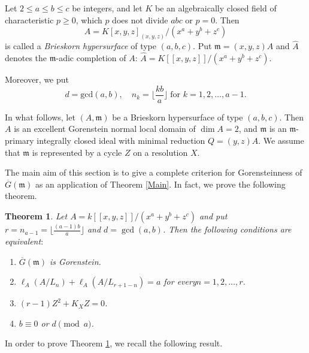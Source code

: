 \documentclass[12pt]{amsart}
\newtheorem{thm}{Theorem}[section]
\theoremstyle{definition}
\theoremstyle{remark}
\numberwithin{equation}{section}
\newcommand{\m}{\mathfrak m}
\renewcommand{\:}{\colon}
\begin{document}
\par \vspace{2mm}
Let  $2 \le a \le b \le c$ be integers, and let $K$ be an 
algebraically closed field of characteristic $p \ge 0$, which 
$p$ does not divide $abc$ or $p=0$. 
Then 
\[
A=K[x,y,z]_{(x,y,z)}/(x^a+y^b+z^c)
\] 
is called a \textit{Brieskorn hypersurface} of type $(a,b,c)$. 
Put $\m=(x,y,z)A$ and $\widehat{A}$ denotes the $\m$-adic 
completion of $A$: 
$\widehat{A}=K[[x,y,z]]/(x^a+y^b+z^c)$. 
\par \vspace{2mm}
Moreover, we put 
\[
d=\mathrm{gcd}(a,b),  
\quad 
n_k=\lfloor \frac{kb}{a} \rfloor \;\text{for $k=1,2,\ldots,a-1$}. 
\]

\par \vspace{2mm}
In what follows, let $(A,\m)$ be a Brieskorn hypersurface 
of type $(a,b,c)$. 
Then $A$ is an excellent Gorenstein normal local domain of $\dim A=2$,  
and $\m$ is an $\m$-primary integrally closed ideal with minimal 
reduction $Q=(y,z)A$. 
 We assume that $\m$ is represented by a cycle $Z$ on a resolution $X$.

\par \vspace{2mm}
The main aim of this section is to give a complete criterion for Gorensteinness of $\overline{G}(\m)$ as an application of Theorem \ref{Main}. 
In fact, we prove the following theorem. 

\begin{thm} \label{BmaxThm}
Let $A=k[[x,y,z]]/(x^a+y^b+z^c)$ and put $r=n_{a-1}=\lfloor \frac{(a-1)b}{a} \rfloor$ and $d=\gcd(a,b)$. 
Then the following conditions are equivalent$:$
\begin{enumerate}
\item $\overline{G}(\m)$ is Gorenstein. 
\item $\ell_A(A/L_n)+\ell_A(A/L_{r+1-n})=a$ for every$n=1,2,\ldots, r$.  
\item $(r-1)Z^2+K_XZ=0$.  
\item $b \equiv  0$ or $d \pmod{a}$. 
\end{enumerate}
\end{thm}

\par \vspace{2mm}
In order to prove Theorem \ref{BmaxThm}, we recall the following result. 
\end{document}
